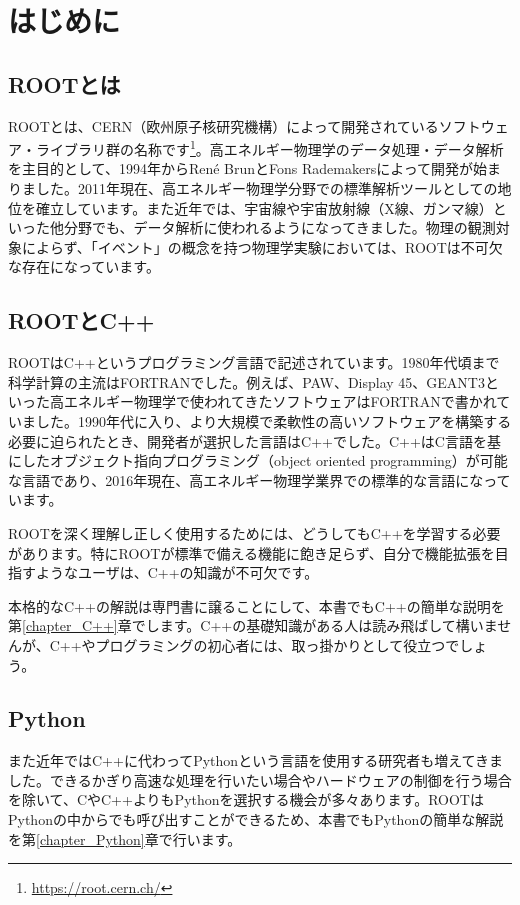 \chapter{はじめに}

\section{ROOTとは}
ROOTとは、CERN（欧州原子核研究機構）によって開発されているソフトウェア・ライブラリ群の名称です\footnote{\url{https://root.cern.ch/}}。高エネルギー物理学のデータ処理・データ解析を主目的として、1994年からRen\'e BrunとFons Rademakersによって開発が始まりました。2011年現在、高エネルギー物理学分野での標準解析ツールとしての地位を確立しています。また近年では、宇宙線や宇宙放射線（X線、ガンマ線）といった他分野でも、データ解析に使われるようになってきました。物理の観測対象によらず、「イベント」の概念を持つ物理学実験においては、ROOTは不可欠な存在になっています。

\section{ROOTとC++}
ROOTはC++というプログラミング言語で記述されています。1980年代頃まで科学計算の主流はFORTRANでした。例えば、PAW、Display 45、GEANT3といった高エネルギー物理学で使われてきたソフトウェアはFORTRANで書かれていました。1990年代に入り、より大規模で柔軟性の高いソフトウェアを構築する必要に迫られたとき、開発者が選択した言語はC++でした。C++はC言語を基にしたオブジェクト指向プログラミング（object oriented programming）が可能な言語であり、2016年現在、高エネルギー物理学業界での標準的な言語になっています。

ROOTを深く理解し正しく使用するためには、どうしてもC++を学習する必要があります。特にROOTが標準で備える機能に飽き足らず、自分で機能拡張を目指すようなユーザは、C++の知識が不可欠です。

本格的なC++の解説は専門書に譲ることにして、本書でもC++の簡単な説明を第\ref{chapter_C++}章でします。C++の基礎知識がある人は読み飛ばして構いませんが、C++やプログラミングの初心者には、取っ掛かりとして役立つでしょう。

\section{Python}
また近年ではC++に代わってPythonという言語を使用する研究者も増えてきました。できるかぎり高速な処理を行いたい場合やハードウェアの制御を行う場合を除いて、CやC++よりもPythonを選択する機会が多々あります。ROOTはPythonの中からでも呼び出すことができるため、本書でもPythonの簡単な解説を第\ref{chapter_Python}章で行います。


